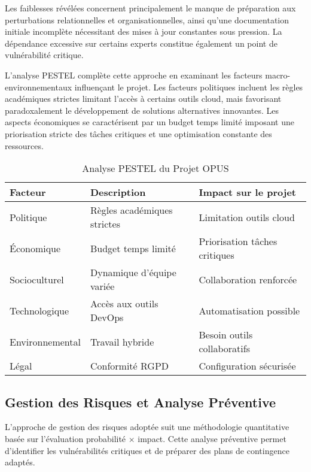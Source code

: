 \documentclass[12pt,a4paper]{article}
\begin{document}
Les faiblesses révélées concernent principalement le manque de préparation aux perturbations relationnelles et organisationnelles, ainsi qu'une documentation initiale incomplète nécessitant des mises à jour constantes sous pression. La dépendance excessive sur certains experts constitue également un point de vulnérabilité critique.

L'analyse PESTEL complète cette approche en examinant les facteurs macro-environnementaux influençant le projet. Les facteurs politiques incluent les règles académiques strictes limitant l'accès à certains outils cloud, mais favorisant paradoxalement le développement de solutions alternatives innovantes. Les aspects économiques se caractérisent par un budget temps limité imposant une priorisation stricte des tâches critiques et une optimisation constante des ressources.

\begin{table}[H]
\centering
\caption{Analyse PESTEL du Projet OPUS}
\begin{tabular}{|p{3cm}|p{5cm}|p{4cm}|}
\hline
\textbf{Facteur} & \textbf{Description} & \textbf{Impact sur le projet} \\
\hline
Politique & Règles académiques strictes & Limitation outils cloud \\
\hline
Économique & Budget temps limité & Priorisation tâches critiques \\
\hline
Socioculturel & Dynamique d'équipe variée & Collaboration renforcée \\
\hline
Technologique & Accès aux outils DevOps & Automatisation possible \\
\hline
Environnemental & Travail hybride & Besoin outils collaboratifs \\
\hline
Légal & Conformité RGPD & Configuration sécurisée \\
\hline
\end{tabular}
\end{table}

\subsection{Gestion des Risques et Analyse Préventive}

L'approche de gestion des risques adoptée suit une méthodologie quantitative basée sur l'évaluation probabilité × impact. Cette analyse préventive permet d'identifier les vulnérabilités critiques et de préparer des plans de contingence adaptés.
\end{document}
